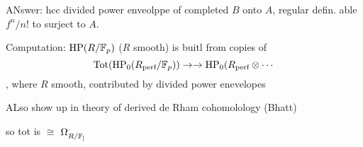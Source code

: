 ANswer: hcc divided power enveolppe of completed $B$ onto $A$, regular defin. able $f^n/n!$ to surject to $A$. 



Computation: $\operatorname{HP}(R/\mathbb{F}_p)$ ($R$ smooth) is buitl from copies of 
	\[
	\operatorname{Tot}(\operatorname{HP}_0(R_{\text{perf}}/  \mathbb{F}_p)) \to \to \operatorname{HP}_0(R_{\text{perf}} \otimes \cdots
	\]
, where $R$ smooth, contributed by divided power enevelopes 

ALso show up in theory of derived de Rham cohomolology (Bhatt)

so tot is $\cong$ $\Omega_{R/\mathbb{F}_[}^\cdot$














































